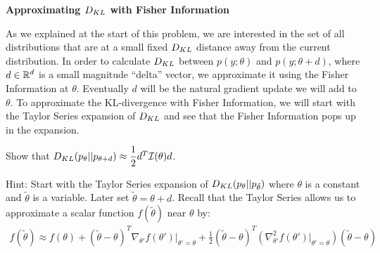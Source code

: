 \item {} \textbf{Approximating $D_{KL}$ with Fisher Information}

As we explained at the start of this problem, we are interested in the set of all distributions that are at a small fixed $D_{KL}$ distance away from the current distribution. In order to calculate $D_{KL}$ between $p(y;\theta)$ and $p(y;\theta+d)$, where $d \in \mathbb{R}^{{d}}$ is a small magnitude ``delta'' vector, we approximate it using the Fisher Information at $\theta$. Eventually $d$ will be the natural gradient update we will add to $\theta$. To approximate the KL-divergence with Fisher Information, we will start with the Taylor Series expansion of $D_{KL}$ and see that the Fisher Information pops up in the expansion.

Show that $D_{KL}(p_{\theta}||p_{\theta+d})\approx \dfrac{1}{2}d^T\mathcal{I}(\theta)d$.

Hint: Start with the Taylor Series expansion of $D_{KL}(p_{\theta}||p_{\tilde{\theta}})$ where $\theta$ is a constant and $\tilde{\theta}$ is a variable. Later set $\tilde{\theta}= \theta + d$. Recall that the Taylor Series allows us to approximate a scalar function $f(\tilde{\theta})$ near $\theta$ by:
\begin{align*}
    f(\tilde{\theta})\approx f(\theta)+(\tilde{\theta}-\theta)^T\nabla_{\theta'} f(\theta')|_{\theta'=\theta} + \frac{1}{2}(\tilde{\theta}-\theta)^T \left(\nabla^2_{\theta'}f(\theta')|_{\theta'=\theta}\right) (\tilde{\theta}-\theta)
\end{align*}

